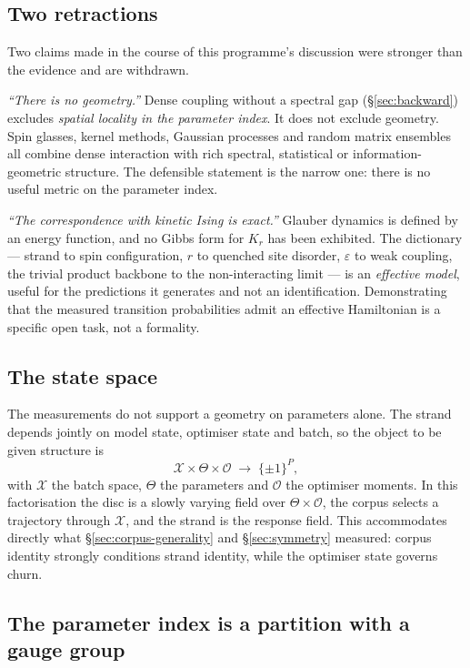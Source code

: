 \subsection{Two retractions}
\label{sec:retractions}

Two claims made in the course of this programme's discussion were stronger than
the evidence and are withdrawn.

\emph{``There is no geometry.''} Dense coupling without a spectral gap
(\S\ref{sec:backward}) excludes \emph{spatial locality in the parameter index}.
It does not exclude geometry. Spin glasses, kernel methods, Gaussian processes
and random matrix ensembles all combine dense interaction with rich spectral,
statistical or information-geometric structure. The defensible statement is the
narrow one: there is no useful metric on the parameter index.

\emph{``The correspondence with kinetic Ising is exact.''} Glauber dynamics is
defined by an energy function, and no Gibbs form for $K_r$ has been exhibited.
The dictionary --- strand to spin configuration, $r$ to quenched site disorder,
$\varepsilon$ to weak coupling, the trivial product backbone to the
non-interacting limit --- is an \emph{effective model}, useful for the
predictions it generates and not an identification. Demonstrating that the
measured transition probabilities admit an effective Hamiltonian is a specific
open task, not a formality.

\subsection{The state space}
\label{sec:statespace}

The measurements do not support a geometry on parameters alone. The strand
depends jointly on model state, optimiser state and batch, so the object to be
given structure is
\[
\mathcal{X}\times\Theta\times\mathcal{O}
\;\longrightarrow\;\{\pm1\}^P ,
\]
with $\mathcal{X}$ the batch space, $\Theta$ the parameters and $\mathcal{O}$
the optimiser moments. In this factorisation the disc is a slowly varying field
over $\Theta\times\mathcal{O}$, the corpus selects a trajectory through
$\mathcal{X}$, and the strand is the response field. This accommodates directly
what \S\ref{sec:corpus-generality} and \S\ref{sec:symmetry} measured: corpus
identity strongly conditions strand identity, while the optimiser state governs
churn.

\subsection{The parameter index is a partition with a gauge group}
\label{sec:gauge}

